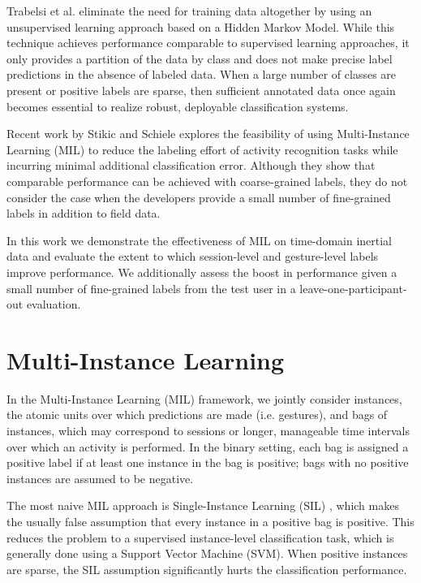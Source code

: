\documentclass{sigchi}
\begin{document}
Trabelsi et al. \cite{Trabelsi:2013} eliminate the need for training data altogether by using an unsupervised learning approach based on a Hidden Markov Model. While this technique achieves performance comparable to supervised learning approaches, it only provides a partition of the data by class and does not make precise label predictions in the absence of labeled data. When a large number of classes are present or positive labels are sparse, then sufficient annotated data once again becomes essential to realize robust, deployable classification systems.

Recent work by Stikic and Schiele \cite{Stikic:2009} explores the feasibility of using Multi-Instance Learning (MIL) to reduce the labeling effort of activity recognition tasks while incurring minimal additional classification error. Although they show that comparable performance can be achieved with coarse-grained labels, they do not consider the case when the developers provide a small number of fine-grained labels in addition to field data.

In this work we demonstrate the effectiveness of MIL on time-domain inertial data and evaluate the extent to which session-level and gesture-level labels improve performance. We additionally assess the boost in performance given a small number of fine-grained labels from the test user in a leave-one-participant-out evaluation.

\section{Multi-Instance Learning}

In the Multi-Instance Learning (MIL) framework, we jointly consider instances, the atomic units over which predictions are made (i.e. gestures), and bags of instances, which may correspond to sessions or longer, manageable time intervals over which an activity is performed. In the binary setting, each bag is assigned a positive label if at least one instance in the bag is positive; bags with no positive instances are assumed to be negative.

The most naive MIL approach is Single-Instance Learning (SIL) \cite{Doran:2014:TEA:2666867.2666935}, which makes the usually false assumption that every instance in a positive bag is positive. This reduces the problem to a supervised instance-level classification task, which is generally done using a Support Vector Machine (SVM). When positive instances are sparse, the SIL assumption significantly hurts the classification performance.
\end{document}
